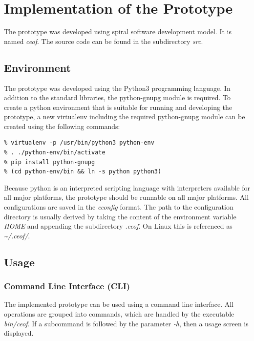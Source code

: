 \chapter{Implementation of the Prototype}
The prototype was developed using spiral software development model.
It is named \textit{ceof}. The source code can be found in the subdirectory
\textit{src}.
\section{Environment}
The prototype was developed using the Python3 programming language.
In addition to the standard libraries, the python-gnupg module is required.
To create a python environment that is suitable for running and developing
the prototype, a new virtualenv including the required python-gnupg module
can be created using the following commands:
\begin{verbatim}
% virtualenv -p /usr/bin/python3 python-env
% . ./python-env/bin/activate
% pip install python-gnupg
% (cd python-env/bin && ln -s python python3)
\end{verbatim}
Because python is an interpreted scripting language with interpreters
available for all major platforms, the prototype should be runnable
on all major platforms.
All configurations are saved in the \textit{cconfig}\cite{cconfig} format.
The path to the configuration directory is usually derived by taking
the content of the environment variable \textit{HOME} and appending
the subdirectory \textit{.ceof}. On Linux this is referenced as
\textit{\textasciitilde{}/.ceof/}.
\section{Usage}
\subsection{Command Line Interface (CLI)}
The implemented prototype can be used using a command line interface.
All operations are grouped into commands, which are handled by the
executable \textit{bin/ceof}. If a subcommand is followed by the parameter
\textit{-h}, then a usage screen is displayed.
